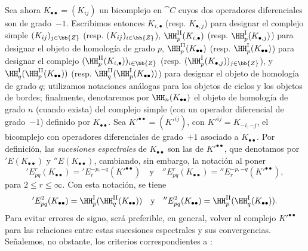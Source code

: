 \documentclass[oneside]{amsart}
\renewcommand{\leq}{\leqslant}
\let\EGAOriginalLabel\label
\renewcommand{\label}[1]{\phantomsection\EGAOriginalLabel{#1}}
\begin{document}
\begin{env}[11.3.5]
\label{0.11.3.5}
Sea ahora $K_{\bullet\bullet} = (K_{ij})$ un bicomplejo en $\cat{C}$ cuyos dos operadores diferenciales son de grado~$-1$.
Escribimos entonces $K_{i,\bullet}$ (resp. $K_{\bullet,j}$) para designar el complejo simple $(K_{ij})_{j\in\bb{Z}}$ (resp. $(K_{ij})_{i\in\bb{Z}}$), $\HH_{p}^\mathrm{II}(K_{i, \bullet})$ (resp. $\HH_{p}^\mathrm{I}(K_{\bullet, j})$) para designar el objeto de homología de grado $p$, $\HH_{p}^\mathrm{II}(K_{\bullet\bullet})$ (resp. $\HH_{p}^\mathrm{I}(K_{\bullet\bullet})$) para designar el complejo $(\HH_{p}^\mathrm{II}(K_{i, \bullet}))_{i \in\bb{Z}}$ (resp. $(\HH_{p}^\mathrm{I}(K_{\bullet, j}))_{j \in\bb{Z}}$), y $\HH_q^\mathrm{I}(\HH_{p}^\mathrm{II}(K_{\bullet\bullet}))$ (resp. $\HH_q^\mathrm{II}(\HH_{p}^\mathrm{I}(K_{\bullet\bullet}))$) para designar el objeto de homología de grado $q$;
utilizamos notaciones análogas para los objetos de ciclos y los objetos de bordes;
finalmente, denotaremos por $\HH_n(K_{\bullet\bullet})$ el objeto de homología de grado $n$ (cuando exista) del complejo simple (con un operador diferencial de grado~$-1$) definido por $K_{\bullet\bullet}$.
Sea $K'^{\bullet\bullet}=(K'^{ij})$, con $K'^{ij}=K_{-i,-j}$, el bicomplejo con operadores diferenciales de grado~$+1$ asociado a $K_{\bullet\bullet}$.
Por definición, las \emph{sucesiones espectrales} de $K_{\bullet\bullet}$ son las de $K'^{\bullet\bullet}$, que denotamos por $'E(K_{\bullet\bullet})$ y $''E(K_{\bullet\bullet})$, cambiando, sin embargo, la notación al poner
\[
  'E_{pq}^{r}(K_{\bullet\bullet})
  = 'E_{r}^{-p,-q}(K'^{\bullet\bullet})
  \quad\text{y}\quad
  ''E_{pq}^{r}(K_{\bullet\bullet})
  = ''E_{r}^{-p,-q}(K'^{\bullet\bullet}), 
\]
para $2\leq r \leq \infty$.
Con esta notación, se tiene
\[
  'E_{pq}^{2}(K_{\bullet\bullet})
  = \HH_{p}^\mathrm{I}(\HH_{q}^\mathrm{II}(K_{\bullet\bullet}))
  \quad\text{y}\quad
  ''E_{pq}^{2}(K_{\bullet\bullet})
  = \HH_{p}^\mathrm{II}(\HH_{q}^\mathrm{I}(K_{\bullet\bullet})).
\]
Para evitar errores de signo, será preferible, en general, volver al complejo $K'^{\bullet\bullet}$ para las relaciones entre estas sucesiones espectrales y sus convergencias.
Señalemos, no obstante, los criterios correspondientes a :
\end{env}
\end{document}
